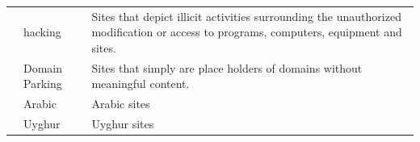 \begin{longtable}{p{}|p{}|p{}}
                                                       & hacking & Sites that depict illicit activities surrounding the unauthorized modification or access to programs, computers, equipment and sites. \\ 
                                                       & Domain Parking & Sites that simply are place holders of domains without meaningful content. \\ \hline
     & Arabic & Arabic sites \\ 
                                                        & Uyghur & Uyghur sites \\ \hline
\end{longtable}